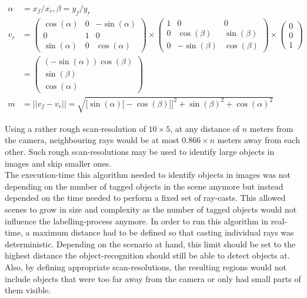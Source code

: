 \begin{equation}
    \begin{split}
        \alpha & = x_f / x_r, \beta = y_f / y_r\\
        v_r & = \begin{pmatrix}\cos(\alpha) & 0 & -\sin(\alpha) \\ 0 & 1 & 0 \\ \sin(\alpha) & 0 & \cos(\alpha)\end{pmatrix} \times
        \begin{pmatrix}1 & 0 & 0 \\ 0 & \cos(\beta) & \sin(\beta) \\ 0 & -\sin(\beta) & \cos(\beta)\end{pmatrix} \times
        \begin{pmatrix}0 \\ 0 \\ 1\end{pmatrix}\\
            & = \begin{pmatrix}(-\sin(\alpha)) \cos(\beta) \\ \sin(\beta) \\ \cos(\alpha)\end{pmatrix}\\
        m   &= || v_f - v_r || = \sqrt{\Big[\sin(\alpha) \big[-\cos(\beta)\big]\Big]^2 + \sin(\beta)^2 + \cos(\alpha)^2}
    \end{split}
\end{equation}

Using a rather rough scan-resolution of $10 \times 5$, at any distance of $n$ meters from the camera, neighbouring rays would be at most $0.866 \times n$ meters away from each other. Such rough scan-resolutions may be used to identify large objects in images and skip smaller ones.\\
The execution-time this algorithm needed to identify objects in images was not depending on the number of tagged objects in the scene anymore but instead depended on the time needed to perform a fixed set of ray-casts. This allowed scenes to grow in size and complexity as the number of tagged objects would not influence the labelling-process anymore. In order to run this algorithm in real-time, a maximum distance had to be defined so that casting individual rays was deterministic. Depending on the scenario at hand, this limit should be set to the highest distance the object-recognition should still be able to detect objects at. Also, by defining appropriate scan-resolutions, the resulting regions would not include objects that were too far away from the camera or only had small parts of them visible.

